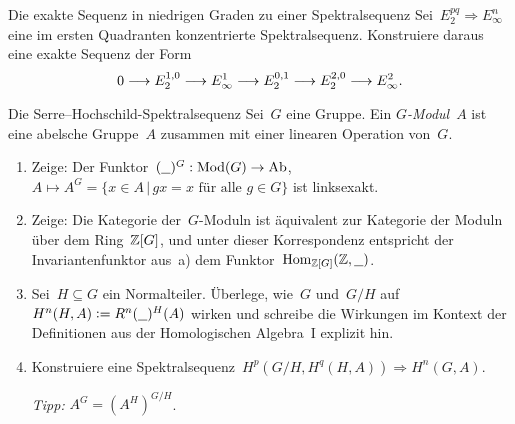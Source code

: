 \documentclass{uebblatt}
\begin{document}
\begin{aufgabe}{Die exakte Sequenz in niedrigen Graden zu einer
Spektralsequenz}
Sei~$E_2^{pq} \Rightarrow E_\infty^n$ eine im ersten Quadranten konzentrierte
Spektralsequenz. Konstruiere daraus eine exakte Sequenz der Form
\[ 0 \longrightarrow E_2^{1,0} \longrightarrow E^1_\infty \longrightarrow E_2^{0,1} \longrightarrow E_2^{2,0} \longrightarrow
E^2_\infty. \]
\end{aufgabe}
\vspace{-1.5em}

\begin{aufgabe}{Die Serre--Hochschild-Spektralsequenz}
Sei~$G$ eine Gruppe. Ein \emph{$G$-Modul}~$A$ ist eine abelsche Gruppe~$A$
zusammen mit einer linearen Operation von~$G$.
\begin{enumerate}
\item Zeige: Der Funktor~$(\underline{\ \ })^G : \mathrm{Mod}(G) \to \mathrm{Ab}$, $A \mapsto A^G = \{ x \in A \,|\,
\text{$gx = x$ für alle $g \in G$} \}$ ist linksexakt.
\item Zeige: Die Kategorie der~$G$-Moduln ist äquivalent zur Kategorie der
Moduln über dem Ring~$\mathbb{Z}[G]$, und unter dieser Korrespondenz entspricht der
Invariantenfunktor aus~a) dem Funktor~$\mathrm{Hom}_{\mathbb{Z}[G]}(\mathbb{Z}, \underline{\ \ })$.
\item Sei~$H \subseteq G$ ein Normalteiler. Überlege, wie~$G$ und~$G/H$ auf~$H^n(H,A)
\vcentcolon= R^n(\underline{\ \ })^H(A)$ wirken und schreibe die Wirkungen im Kontext
der Definitionen aus der Homologischen Algebra~I explizit hin.
\item Konstruiere eine Spektralsequenz~$H^p(G/H, H^q(H,A))
\Rightarrow H^n(G,A)$.
{\tiny\emph{Tipp:} $A^G = (A^H)^{G/H}$.\par}
\end{enumerate}
\end{aufgabe}
\end{document}
